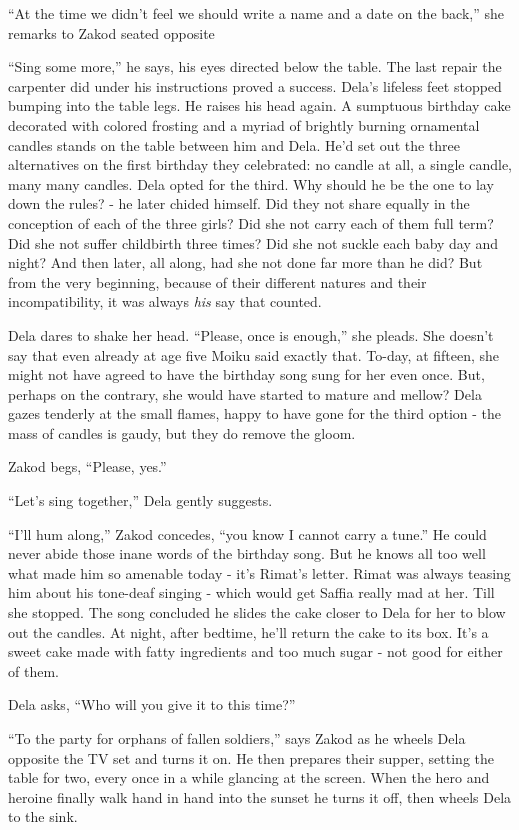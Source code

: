 \documentclass[twoside,11pt]{book}
\begin{document}
``At the time we didn't feel we should write a name and a date on the back,'' she remarks to
Zakod seated opposite

``Sing some more,'' he says, his eyes directed below the table. The last repair the carpenter
did under his instructions proved a success. Dela's lifeless feet stopped bumping into the table legs. He raises his
head again. A sumptuous birthday cake decorated with colored frosting and a myriad of brightly burning ornamental
candles stands on the table between him and Dela. He'd set out the three alternatives on the first birthday they
celebrated: no candle at all, a single candle, many many candles.  Dela opted for the third. Why should he be the one
to lay down the rules? - he later chided himself. Did they not share equally in the conception of each of the three
girls? Did she not carry each of them full term? Did she not suffer childbirth three times? Did she not suckle each
baby day and night? And then later, all along, had she not done far more than he did? But from the very beginning,
because of their different natures and their incompatibility, it was always \textit{his} say that counted.

Dela dares to shake her head. ``Please, once is enough,'' she pleads. She doesn't say that
even already at age five Moiku said exactly that. To-day, at fifteen, she might not have agreed to have the birthday
song sung for her even once. But, perhaps on the contrary, she would have started to mature and mellow? Dela gazes
tenderly at the small flames, happy to have gone for the third option - the mass of candles is gaudy, but they do
remove the gloom.

Zakod begs, ``Please, yes.''

``Let's sing together,'' Dela gently suggests.

``I'll hum along,'' Zakod concedes, ``you know I cannot carry a
tune.'' He could never abide those inane words of the birthday song. But he knows all too well what made
him so amenable today - it's Rimat's letter. Rimat was always teasing him about his tone-deaf singing - which would get
Saffia really mad at her. Till she stopped. The song concluded he slides the cake closer to Dela for her to blow out
the candles. At night, after bedtime, he'll return the cake to its box. It's a sweet cake made with fatty ingredients
and too much sugar - not good for either of them.

Dela asks, ``Who will you give it to this time?''

``To the party for orphans of fallen soldiers,'' says Zakod as he wheels Dela opposite the TV
set and turns it on. He then prepares their supper, setting the table for two, every once in a while glancing at the
screen. When the hero and heroine finally walk hand in hand into the sunset he turns it off, then wheels Dela to the
sink.
\end{document}
